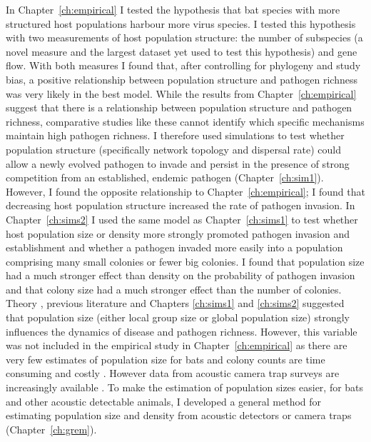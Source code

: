 In Chapter~\ref{ch:empirical} I tested the hypothesis that bat species with more structured host populations harbour more virus species.
I tested this hypothesis with two measurements of host population structure: the number of subspecies (a novel measure and the largest dataset yet used to test this hypothesis) and gene flow.
With both measures I found that, after controlling for phylogeny and study bias, a positive relationship between population structure and pathogen richness was very likely in the best model.
While the results from Chapter~\ref{ch:empirical} suggest that there is a relationship between population structure and pathogen richness, comparative studies like these cannot identify which specific mechanisms maintain high pathogen richness.
I therefore used simulations to test whether population structure (specifically network topology and dispersal rate) could allow a newly evolved pathogen to invade and persist in the presence of strong competition from an established, endemic pathogen (Chapter~\ref{ch:sim1}).
However, I found the opposite relationship to Chapter~\ref{ch:empirical}; I found that decreasing host population structure increased the rate of pathogen invasion.
In Chapter~\ref{ch:sims2} I used the same model as Chapter~\ref{ch:sims1} to test whether host population size or density more strongly promoted pathogen invasion and establishment and whether a pathogen invaded more easily into a population comprising many small colonies or fewer big colonies.
I found that population size had a much stronger effect than density on the probability of pathogen invasion and that colony size had a much stronger effect than the number of colonies.
Theory \cite{may1979population, anderson1979population}, previous literature \cite{kamiya2014determines, nunn2003comparative, morand1998density} and Chapters \ref{ch:sims1} and \ref{ch:sims2} suggested that population size (either local group size or global population size) strongly influences the dynamics of disease and pathogen richness.
However, this variable was not included in the empirical study in Chapter~\ref{ch:empirical} as there are very few estimates of population size for bats and colony counts are time consuming and costly \cite{kloepper2016estimating}.
However data from acoustic camera trap surveys are increasingly available \cite{jones2011indicator}.
To make the estimation of population sizes easier, for bats and other acoustic detectable animals, I developed a general method for estimating population size and density from acoustic detectors or camera traps (Chapter~\ref{ch:grem}).


